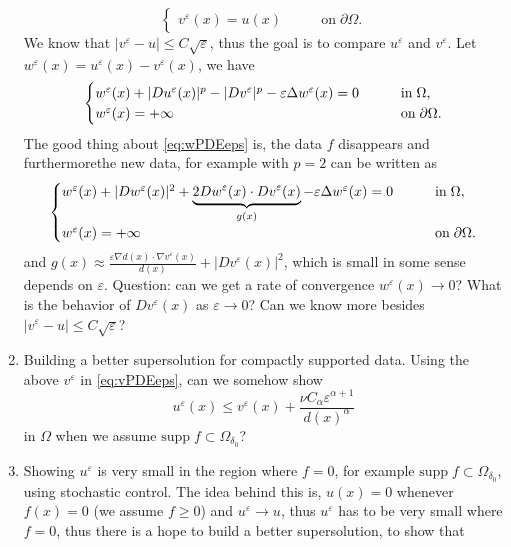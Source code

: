 \documentclass[10pt]{article}
\theoremstyle{plain}
\theoremstyle{remark}
\begin{document}
\begin{enumerate}
\begin{equation}
\begin{cases}
   v^\varepsilon(x) = u(x) &\qquad
    \text{on}\;\partial\Omega.
    \end{cases} 
\end{equation}
We know that $|v^\varepsilon - u|\leq C\sqrt{\varepsilon}$, thus the goal is to compare $u^\varepsilon$ and $v^\varepsilon$. Let $w^\varepsilon(x) = u^\varepsilon(x) - v^\varepsilon(x)$, we have
\begin{equation}\label{eq:wPDEeps}
    \begin{cases}
w^\varepsilon(x) + |Du^\varepsilon(x)|^p  - |Dv^\varepsilon|^p - \varepsilon \Delta w^\varepsilon(x) = 0 &\qquad
    \text{in}\;\Omega, \vspace{0cm}\\
   w^\varepsilon(x) = +\infty &\qquad
    \text{on}\;\partial\Omega.
    \end{cases} 
\end{equation}
The good thing about \eqref{eq:wPDEeps} is, the data $f$ disappears and furthermorethe new data, for example with $p=2$ can be written as
\begin{equation}\label{eq:wwPDEeps}
    \begin{cases}
w^\varepsilon(x) + |Dw^\varepsilon(x)|^2 +\underbrace{2Dw^\varepsilon(x)\cdot Dv^\varepsilon(x)}_{g
(x)} - \varepsilon \Delta w^\varepsilon(x) = 0 &\qquad
    \text{in}\;\Omega, \vspace{0cm}\\
   w^\varepsilon(x) = +\infty &\qquad
    \text{on}\;\partial\Omega.
    \end{cases} 
\end{equation}
and $g(x) \approx \frac{\varepsilon \nabla d(x)\cdot \nabla v^\varepsilon(x)}{d(x)} + |Dv^\varepsilon(x)|^2$, which is small in some sense depends on $\varepsilon$. Question: can we get a rate of convergence $w^\varepsilon(x)\to 0$? What is the behavior of $Dv^\varepsilon(x)$ as $\varepsilon\to 0$? Can we know more besides $|v^\varepsilon - u|\leq C\sqrt{\varepsilon}$?
\item Building a better supersolution for compactly supported data. Using the above $v^\varepsilon$ in \eqref{eq:vPDEeps}, can we somehow show
\begin{equation*}
    u^\varepsilon(x) \leq v^\varepsilon(x) + \frac{\nu C_\alpha \varepsilon^{\alpha+1}}{d(x)^\alpha} 
\end{equation*}
in $\Omega$ when we assume $\mathrm{supp}\;f \subset \Omega_{\delta_0}$? 
\item Showing $u^\varepsilon$ is very small in the region where $f = 0$, for example $\mathrm{supp}\;f \subset \Omega_{\delta_0}$, using stochastic control. The idea behind this is, $u(x) = 0$ whenever $f(x) = 0$ (we assume $f\geq 0$) and $u^\varepsilon\to u$, thus $u^\varepsilon$ has to be very small where $f = 0$, thus there is a hope to build a better supersolution, to show that 

\end{enumerate}
\end{document}
